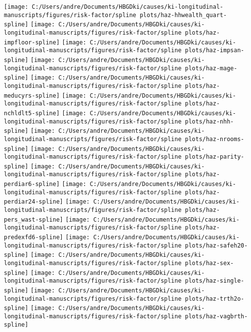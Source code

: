 \documentclass[9pt,]{book}
\begin{document}
\texttt{[image: C:/Users/andre/Documents/HBGDki/causes/ki-longitudinal-manuscripts/figures/risk-factor/spline plots/haz-hhwealth\_quart-spline]}
\texttt{[image: C:/Users/andre/Documents/HBGDki/causes/ki-longitudinal-manuscripts/figures/risk-factor/spline plots/haz-impfloor-spline]}
\texttt{[image: C:/Users/andre/Documents/HBGDki/causes/ki-longitudinal-manuscripts/figures/risk-factor/spline plots/haz-impsan-spline]}
\texttt{[image: C:/Users/andre/Documents/HBGDki/causes/ki-longitudinal-manuscripts/figures/risk-factor/spline plots/haz-mage-spline]}
\texttt{[image: C:/Users/andre/Documents/HBGDki/causes/ki-longitudinal-manuscripts/figures/risk-factor/spline plots/haz-meducyrs-spline]}
\texttt{[image: C:/Users/andre/Documents/HBGDki/causes/ki-longitudinal-manuscripts/figures/risk-factor/spline plots/haz-nchldlt5-spline]}
\texttt{[image: C:/Users/andre/Documents/HBGDki/causes/ki-longitudinal-manuscripts/figures/risk-factor/spline plots/haz-nhh-spline]}
\texttt{[image: C:/Users/andre/Documents/HBGDki/causes/ki-longitudinal-manuscripts/figures/risk-factor/spline plots/haz-nrooms-spline]}
\texttt{[image: C:/Users/andre/Documents/HBGDki/causes/ki-longitudinal-manuscripts/figures/risk-factor/spline plots/haz-parity-spline]}
\texttt{[image: C:/Users/andre/Documents/HBGDki/causes/ki-longitudinal-manuscripts/figures/risk-factor/spline plots/haz-perdiar6-spline]}
\texttt{[image: C:/Users/andre/Documents/HBGDki/causes/ki-longitudinal-manuscripts/figures/risk-factor/spline plots/haz-perdiar24-spline]}
\texttt{[image: C:/Users/andre/Documents/HBGDki/causes/ki-longitudinal-manuscripts/figures/risk-factor/spline plots/haz-pers\_wast-spline]}
\texttt{[image: C:/Users/andre/Documents/HBGDki/causes/ki-longitudinal-manuscripts/figures/risk-factor/spline plots/haz-predexfd6-spline]}
\texttt{[image: C:/Users/andre/Documents/HBGDki/causes/ki-longitudinal-manuscripts/figures/risk-factor/spline plots/haz-safeh20-spline]}
\texttt{[image: C:/Users/andre/Documents/HBGDki/causes/ki-longitudinal-manuscripts/figures/risk-factor/spline plots/haz-sex-spline]}
\texttt{[image: C:/Users/andre/Documents/HBGDki/causes/ki-longitudinal-manuscripts/figures/risk-factor/spline plots/haz-single-spline]}
\texttt{[image: C:/Users/andre/Documents/HBGDki/causes/ki-longitudinal-manuscripts/figures/risk-factor/spline plots/haz-trth2o-spline]}
\texttt{[image: C:/Users/andre/Documents/HBGDki/causes/ki-longitudinal-manuscripts/figures/risk-factor/spline plots/haz-vagbrth-spline]}
\end{document}
